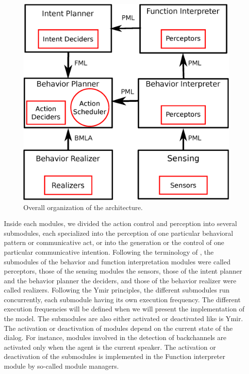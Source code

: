 \begin{figure}
  \centering
  \includegraphics[width=\linewidth]{figure/impl_schema.eps}
  \caption{Overall organization of the architecture.}
  \label{overall_archi}
\end{figure}

Inside each modules, we divided the action control and perception into several submodules, each specialized into the perception of one particular behavioral pattern or communicative act, or into the generation or the control of one particular communicative intention. Following the terminology of \cite{thorisson_mind_1999}, the submodules of the behavior and function interpretation modules were called perceptors, those of the sensing modules the sensors, those of the intent planner and the behavior planner the deciders, and those of the behavior realizer were called realizers. 
Following the Ymir principles, the different submodules run concurrently, each submodule having its own execution frequency. The different execution frequencies will be defined when we will present the implementation of the model. The submodules are also either activated or deactivated like is Ymir.
The activation or deactivation of modules depend on the current state of the dialog. 
For instance, modules involved in the detection of backchannels are activated only when the agent is the current speaker. 
The activation or deactivation of the submodules is implemented in the Function interpreter module by so-called module managers. 

